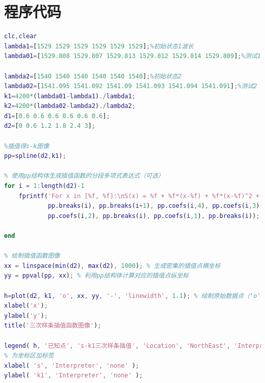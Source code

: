 \documentclass[withoutpreface,bwprint]{cumcmthesis}
\begin{document}
\newpage
\appendix

\section{程序代码}
\begin{lstlisting}[language=Matlab] 
%波长转换为曲率
clc,clear
lambda1=[1529 1529 1529 1529 1529 1529];%初始状态1波长
lambda01=[1529.808 1529.807 1529.813 1529.812 1529.814 1529.809];%测试1

lambda2=[1540 1540 1540 1540 1540 1540];%初始状态2
lambda02=[1541.095 1541.092 1541.09 1541.093 1541.094 1541.091];%测试2
k1=4200*(lambda01-lambda1)./lambda1;
k2=4200*(lambda02-lambda2)./lambda2;
d1=[0.6 0.6 0.6 0.6 0.6 0.6];
d2=[0 0.6 1.2 1.8 2.4 3];

%插值得s-k图像
pp=spline(d2,k1);

% 使用pp结构体生成插值函数的分段多项式表达式（可选）
for i = 1:length(d2)-1
    fprintf('For x in [%f, %f]:\nS(x) = %f + %f*(x-%f) + %f*(x-%f)^2 + %f*(x-%f)^3\n\n', ...
            pp.breaks(i), pp.breaks(i+1), pp.coefs(i,4), pp.coefs(i,3), pp.breaks(i), ...
            pp.coefs(i,2), pp.breaks(i), pp.coefs(i,1), pp.breaks(i));

end

% 绘制插值函数图像
xx = linspace(min(d2), max(d2), 1000); % 生成密集的插值点横坐标
yy = ppval(pp, xx); % 利用pp结构体计算对应的插值点纵坐标

h=plot(d2, k1, 'o', xx, yy, '-', 'linewidth', 1.1); % 绘制原始数据点（'o'）及插值曲线
xlabel('x');
ylabel('y');
title('三次样条插值函数图像');

legend( h, '已知点', 's-k1三次样条插值', 'Location', 'NorthEast', 'Interpreter', 'none' );
% 为坐标区加标签
xlabel( 's', 'Interpreter', 'none' );
ylabel( 'k1', 'Interpreter', 'none' );
 \end{lstlisting}
\end{document}
